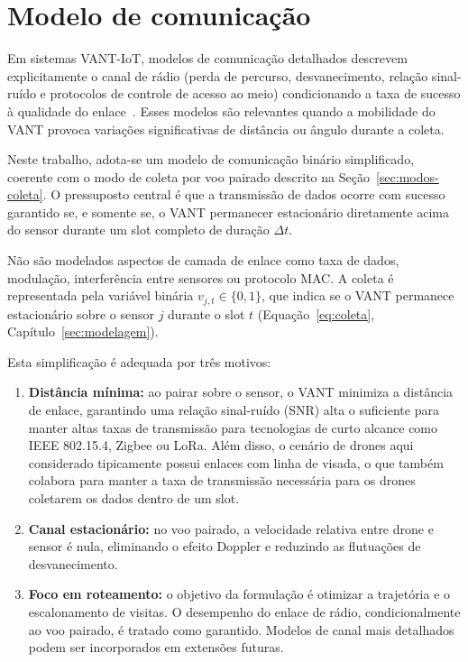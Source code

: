 \section{Modelo de comunicação}
\label{sec:modelo-comunicacao}

Em sistemas VANT-IoT, modelos de comunicação detalhados descrevem explicitamente o canal de rádio (perda de percurso, desvanecimento, relação sinal-ruído e protocolos de controle de acesso ao meio) condicionando a taxa de sucesso à qualidade do enlace~\cite{wei2022survey,messaoudi2023survey}. Esses modelos são relevantes quando a mobilidade do VANT provoca variações significativas de distância ou ângulo durante a coleta.

Neste trabalho, adota-se um modelo de comunicação binário simplificado, coerente com o modo de coleta por voo pairado descrito na Seção~\ref{sec:modos-coleta}. O pressuposto central é que a transmissão de dados ocorre com sucesso garantido se, e somente se, o VANT permanecer estacionário diretamente acima do sensor durante um slot completo de duração $\Delta t$.

Não são modelados aspectos de camada de enlace como taxa de dados, modulação, interferência entre sensores ou protocolo MAC. A coleta é representada pela variável binária $v_{j,t} \in \{0,1\}$, que indica se o VANT permanece estacionário sobre o sensor $j$ durante o slot $t$ (Equação~\eqref{eq:coleta}, Capítulo~\ref{sec:modelagem}).

Esta simplificação é adequada por três motivos:

\begin{enumerate}
    \item \textbf{Distância mínima:} ao pairar sobre o sensor, o VANT minimiza a distância de enlace, garantindo uma relação sinal-ruído (SNR) alta o suficiente para manter altas taxas de transmissão para tecnologias de curto alcance como IEEE 802.15.4, Zigbee ou LoRa. Além disso, o cenário de drones aqui considerado tipicamente possui enlaces com linha de visada, o que também colabora para manter a taxa de transmissão necessária para os drones coletarem os dados dentro de um slot.
    \item \textbf{Canal estacionário:} no voo pairado, a velocidade relativa entre drone e sensor é nula, eliminando o efeito Doppler e reduzindo as flutuações de desvanecimento.
    \item \textbf{Foco em roteamento:} o objetivo da formulação é otimizar a trajetória e o escalonamento de visitas. O desempenho do enlace de rádio, condicionalmente ao voo pairado, é tratado como garantido. Modelos de canal mais detalhados podem ser incorporados em extensões futuras.
\end{enumerate}

